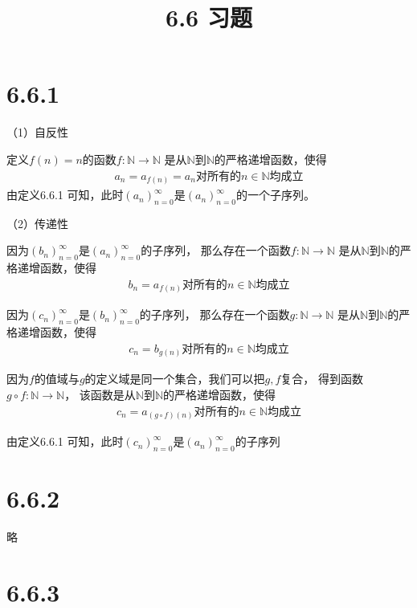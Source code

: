 \documentclass{article}
\theoremstyle{mystyle}
\begin{document}
\title{6.6 习题}
\maketitle

\section*{6.6.1}

（1）自反性

定义$f(n)=n$的函数$f : \mathbb{N} \rightarrow \mathbb{N}$
是从$\mathbb{N}$到$\mathbb{N}$的严格递增函数，使得
\begin{align*}
  a_n = a_{f(n)} = a_n \text{对所有的$n \in \mathbb{N}$均成立}
\end{align*}
由定义6.6.1 可知，此时$(a_n)_{n=0}^\infty$是$(a_n)_{n=0}^\infty$的一个子序列。

（2）传递性

因为$(b_n)_{n=0}^\infty$是$(a_n)_{n=0}^\infty$的子序列，
那么存在一个函数$f : \mathbb{N} \rightarrow \mathbb{N}$
是从$\mathbb{N}$到$\mathbb{N}$的严格递增函数，使得
\begin{align*}
  b_n = a_{f(n)} \text{对所有的$n \in \mathbb{N}$均成立}
\end{align*}

因为$(c_n)_{n=0}^\infty$是$(b_n)_{n=0}^\infty$的子序列，
那么存在一个函数$g : \mathbb{N} \rightarrow \mathbb{N}$
是从$\mathbb{N}$到$\mathbb{N}$的严格递增函数，使得
\begin{align*}
  c_n = b_{g(n)} \text{对所有的$n \in \mathbb{N}$均成立}
\end{align*}

因为$f$的值域与$g$的定义域是同一个集合，我们可以把$g,f$复合，
得到函数$g \circ f : \mathbb{N} \rightarrow \mathbb{N}$，
该函数是从$\mathbb{N}$到$\mathbb{N}$的严格递增函数，使得
\begin{align*}
  c_n = a_{(g \circ f)(n)} \text{对所有的$n \in \mathbb{N}$均成立}
\end{align*}

由定义6.6.1 可知，此时$(c_n)_{n=0}^\infty$是$(a_n)_{n=0}^\infty$的子序列

\section*{6.6.2}

略

\section*{6.6.3}
\end{document}
